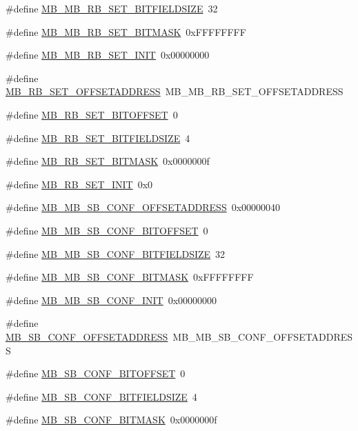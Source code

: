 \begin{DoxyCompactItemize}
\item 
\#define \hyperlink{a00562_acc4d213afc1a5925de80910f6f71b7d8}{MB\_\-MB\_\-RB\_\-SET\_\-BITFIELDSIZE}~32
\item 
\#define \hyperlink{a00562_a82f43ee9f93fa1def7ded40605484c29}{MB\_\-MB\_\-RB\_\-SET\_\-BITMASK}~0xFFFFFFFF
\item 
\#define \hyperlink{a00562_af7596f9cf749d5d07220dd0d7d5734b7}{MB\_\-MB\_\-RB\_\-SET\_\-INIT}~0x00000000
\item 
\#define \hyperlink{a00562_abe72a2bd73f8a64e98523a119f226856}{MB\_\-RB\_\-SET\_\-OFFSETADDRESS}~MB\_\-MB\_\-RB\_\-SET\_\-OFFSETADDRESS
\item 
\#define \hyperlink{a00562_a8a50e0d90736b9df9a3f4912d205fed0}{MB\_\-RB\_\-SET\_\-BITOFFSET}~0
\item 
\#define \hyperlink{a00562_a0c0a7c34741e7f79538e238a1dd80a6f}{MB\_\-RB\_\-SET\_\-BITFIELDSIZE}~4
\item 
\#define \hyperlink{a00562_a8c365378b81896ee394979a116c94207}{MB\_\-RB\_\-SET\_\-BITMASK}~0x0000000f
\item 
\#define \hyperlink{a00562_affee8a6a909b5aa0a4392f90fb94efe5}{MB\_\-RB\_\-SET\_\-INIT}~0x0
\item 
\#define \hyperlink{a00562_a0d5619e4ffe0e525c9e1fa6d4deeeb3f}{MB\_\-MB\_\-SB\_\-CONF\_\-OFFSETADDRESS}~0x00000040
\item 
\#define \hyperlink{a00562_aefbaca2e8d5e7787a4f06438d4cbd0bd}{MB\_\-MB\_\-SB\_\-CONF\_\-BITOFFSET}~0
\item 
\#define \hyperlink{a00562_a31950d7a198b998ecb323fc0aa1e16b6}{MB\_\-MB\_\-SB\_\-CONF\_\-BITFIELDSIZE}~32
\item 
\#define \hyperlink{a00562_ab447d91be169dfb8055485302e33b1f8}{MB\_\-MB\_\-SB\_\-CONF\_\-BITMASK}~0xFFFFFFFF
\item 
\#define \hyperlink{a00562_a0e59128258090e0876da2a9d3d97eb35}{MB\_\-MB\_\-SB\_\-CONF\_\-INIT}~0x00000000
\item 
\#define \hyperlink{a00562_ad928a3aaa38dbc6760a399a4ca4811f9}{MB\_\-SB\_\-CONF\_\-OFFSETADDRESS}~MB\_\-MB\_\-SB\_\-CONF\_\-OFFSETADDRESS
\item 
\#define \hyperlink{a00562_a1e98b24ea5e1fecc721b5d9f3fa99dc7}{MB\_\-SB\_\-CONF\_\-BITOFFSET}~0
\item 
\#define \hyperlink{a00562_a21d36de093931482494c5856ac37b13d}{MB\_\-SB\_\-CONF\_\-BITFIELDSIZE}~4
\item 
\#define \hyperlink{a00562_a89b67538a8dcddb1e5a38b35a5d0da6d}{MB\_\-SB\_\-CONF\_\-BITMASK}~0x0000000f
\item 

\end{DoxyCompactItemize}

